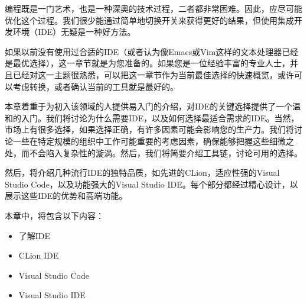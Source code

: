 编程既是一门艺术，也是一种深奥的技术过程，二者都非常困难。因此，应尽可能优化这个过程。我们很少能通过简单地切换开关来获得更好的结果，但使用集成开发环境（IDE）无疑是一种好方法。

如果以前没有使用过合适的IDE（或者认为像Emacs或Vim这样的文本处理器已经是最优选择），这一章节就是为您准备的。如果您是一位经验丰富的专业人士，并且已经对这一主题很熟悉，可以把这一章节作为当前最佳选择的快速概览，或许可以考虑转换，或者确认当前的工具就是最好的。

本章着重于为初入该领域的人提供易入门的介绍，对IDE的关键选择提供了一个温和的入门。我们将讨论为什么需要IDE，以及如何选择最适合需求的IDE。当然，市场上有很多选择，如果选择正确，有许多因素可能会影响您的生产力。我们将讨论一些在特定规模的组织中工作可能重要的考虑因素，确保能够把握这些细微之处，而不会陷入复杂性的漩涡。然后，我们将简要介绍工具链，讨论可用的选择。

然后，将介绍几种流行IDE的独特品质，如先进的CLion，适应性强的Visual Studio Code，以及功能强大的Visual Studio IDE。每个部分都经过精心设计，以展示这些IDE的优势和高端功能。

本章中，将包含以下内容：

\begin{itemize}
\item
了解IDE

\item
CLion IDE

\item
Visual Studio Code

\item
Visual Studio IDE
\end{itemize}




